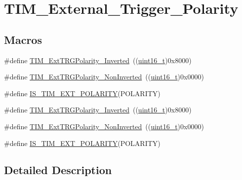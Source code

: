 \hypertarget{group___t_i_m___external___trigger___polarity}{}\section{T\+I\+M\+\_\+\+External\+\_\+\+Trigger\+\_\+\+Polarity}
\label{group___t_i_m___external___trigger___polarity}
\subsection*{Macros}
\begin{DoxyCompactItemize}
\item 
\#define \hyperlink{group___t_i_m___external___trigger___polarity_ga96f3959a02c0491ab8d65cfa384ce7e3}{T\+I\+M\+\_\+\+Ext\+T\+R\+G\+Polarity\+\_\+\+Inverted}~((\hyperlink{_p_e___types_8h_a1f1825b69244eb3ad2c7165ddc99c956}{uint16\+\_\+t})0x8000)
\item 
\#define \hyperlink{group___t_i_m___external___trigger___polarity_ga63fe7c58c491d2a812d5621b71c2d0c5}{T\+I\+M\+\_\+\+Ext\+T\+R\+G\+Polarity\+\_\+\+Non\+Inverted}~((\hyperlink{_p_e___types_8h_a1f1825b69244eb3ad2c7165ddc99c956}{uint16\+\_\+t})0x0000)
\item 
\#define \hyperlink{group___t_i_m___external___trigger___polarity_ga489ea1fed28375dec49cf1b8dfac47ca}{I\+S\+\_\+\+T\+I\+M\+\_\+\+E\+X\+T\+\_\+\+P\+O\+L\+A\+R\+I\+TY}(P\+O\+L\+A\+R\+I\+TY)
\item 
\#define \hyperlink{group___t_i_m___external___trigger___polarity_ga96f3959a02c0491ab8d65cfa384ce7e3}{T\+I\+M\+\_\+\+Ext\+T\+R\+G\+Polarity\+\_\+\+Inverted}~((\hyperlink{_p_e___types_8h_a1f1825b69244eb3ad2c7165ddc99c956}{uint16\+\_\+t})0x8000)
\item 
\#define \hyperlink{group___t_i_m___external___trigger___polarity_ga63fe7c58c491d2a812d5621b71c2d0c5}{T\+I\+M\+\_\+\+Ext\+T\+R\+G\+Polarity\+\_\+\+Non\+Inverted}~((\hyperlink{_p_e___types_8h_a1f1825b69244eb3ad2c7165ddc99c956}{uint16\+\_\+t})0x0000)
\item 
\#define \hyperlink{group___t_i_m___external___trigger___polarity_ga489ea1fed28375dec49cf1b8dfac47ca}{I\+S\+\_\+\+T\+I\+M\+\_\+\+E\+X\+T\+\_\+\+P\+O\+L\+A\+R\+I\+TY}(P\+O\+L\+A\+R\+I\+TY)
\end{DoxyCompactItemize}


\subsection{Detailed Description}



